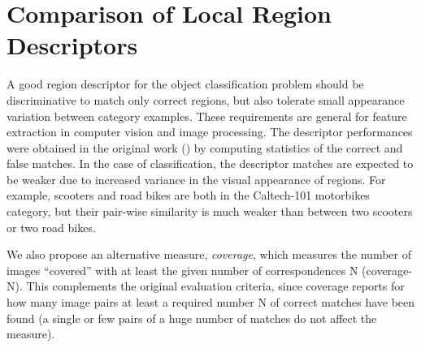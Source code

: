 \documentclass[preprint,authoryear,review]{elsarticle}
\begin{document}
\section{Comparison of Local Region Descriptors}
%
A good region descriptor for the object classification problem should be
discriminative to match only correct regions, but also tolerate
small appearance variation between category examples. These requirements are
general for feature extraction in computer vision and image
processing. The descriptor performances were obtained in the original
work (\cite{MikSch:2005}) by computing statistics of the correct and false
matches. In the case of classification, the descriptor matches are expected to
be weaker due to increased variance in the visual appearance of regions.
For example, scooters and road bikes are both in the
Caltech-101 motorbikes category, but their pair-wise similarity
is much weaker than between two scooters or two road bikes.

We also propose an alternative measure, {\em coverage}, which
measures the number of images ``covered'' with at least the given number of correspondences N (coverage-N). 
This complements the original evaluation criteria, since coverage
reports for how many image pairs at least a required number N of
correct matches have been found (a single or few pairs of a huge number
of matches do not affect the measure).




\end{document}
